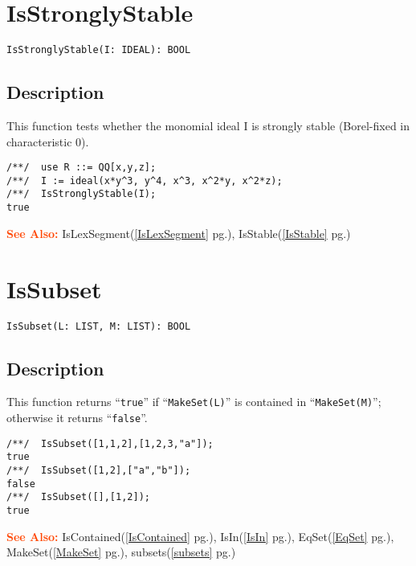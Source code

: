 \documentclass[a4paper]{mybook}
\newenvironment{command}{}{} %
\newcommand\SeeAlso{\par\textcolor{OrangeRed}{\textbf{\large See Also: }}}
\begin{document}
\section{IsStronglyStable}
\label{IsStronglyStable}
\begin{command} %


\begin{Verbatim}[label=syntax, rulecolor=\color{MidnightBlue},
frame=single]
IsStronglyStable(I: IDEAL): BOOL
\end{Verbatim}


\subsection*{Description}

This function tests whether the monomial ideal I is strongly stable
(Borel-fixed in characteristic 0).
\begin{Verbatim}[label=example, rulecolor=\color{PineGreen}, frame=single]
/**/  use R ::= QQ[x,y,z];
/**/  I := ideal(x*y^3, y^4, x^3, x^2*y, x^2*z);
/**/  IsStronglyStable(I);
true
\end{Verbatim}


\SeeAlso %
  IsLexSegment(\ref{IsLexSegment} pg.\pageref{IsLexSegment}), 
    IsStable(\ref{IsStable} pg.\pageref{IsStable})
\end{command} %

\section{IsSubset}
\label{IsSubset}
\begin{command} %


\begin{Verbatim}[label=syntax, rulecolor=\color{MidnightBlue},
frame=single]
IsSubset(L: LIST, M: LIST): BOOL
\end{Verbatim}


\subsection*{Description}

This function returns ``\verb&true&'' if ``\verb&MakeSet(L)&'' is contained in ``\verb&MakeSet(M)&'';
otherwise it returns ``\verb&false&''.
\begin{Verbatim}[label=example, rulecolor=\color{PineGreen}, frame=single]
/**/  IsSubset([1,1,2],[1,2,3,"a"]);
true
/**/  IsSubset([1,2],["a","b"]);
false
/**/  IsSubset([],[1,2]);
true
\end{Verbatim}


\SeeAlso %
  IsContained(\ref{IsContained} pg.\pageref{IsContained}), 
    IsIn(\ref{IsIn} pg.\pageref{IsIn}), 
    EqSet(\ref{EqSet} pg.\pageref{EqSet}), 
    MakeSet(\ref{MakeSet} pg.\pageref{MakeSet}), 
    subsets(\ref{subsets} pg.\pageref{subsets})
\end{command} %
\end{document}
